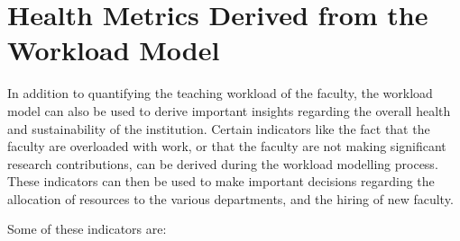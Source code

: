 



\section{Health Metrics Derived from the Workload Model}

In addition to quantifying the teaching workload of the faculty, the workload model can also be used to derive important insights regarding the overall health and sustainability of the institution. Certain indicators like the fact that the faculty are overloaded with work, or that the faculty are not making significant research contributions, can be derived during the workload modelling process. These indicators can then be used to make important decisions regarding the allocation of resources to the various departments, and the hiring of new faculty.

Some of these indicators are:


